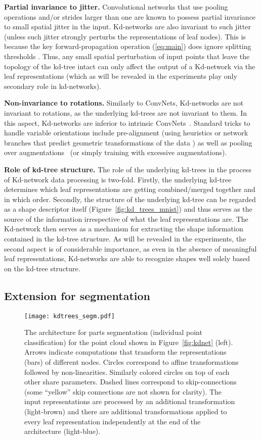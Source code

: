\documentclass[10pt,twocolumn,letterpaper]{article}
\newcommand{\fig}[1]{Figure~\ref{fig:#1}}
\newcommand{\eq}[1]{(\ref{eq:#1})}
\begin{document}
\textbf{Partial invariance to jitter.} Convolutional networks that use pooling operations and/or strides larger than one are known to possess partial invariance to small spatial jitter in the input. Kd-networks are also invariant to such jitter (unless such jitter strongly perturbs the representations of leaf nodes). This is because the key forward-propagation operation \eq{main} does ignore splitting thresholds . Thus, any small spatial perturbation of input points that leave the topology of the kd-tree intact can only affect the output of a Kd-network via the leaf representations (which as will be revealed in the experiments play only secondary role in kd-networks).

\textbf{Non-invariance to rotations.} Similarly to ConvNets, Kd-networks are not invariant to rotations, as the underlying kd-trees are not invariant to them. In this aspect, Kd-networks are inferior to intrinsic ConvNets~\cite{Bruna13,Boscaini15,Boscaini16}. Standard tricks to handle variable orientations include pre-alignment (using heuristics or network branches that predict geometric transformations of the data \cite{Jaderberg15,Qi16b}) as well as pooling over augmentations~\cite{Laptev16} (or simply training with excessive augmentations).

\textbf{Role of kd-tree structure.} The role of the underlying kd-trees in the process of Kd-network data processing is two-fold. Firstly, the underlying kd-tree determines which leaf representations are getting combined/merged together and in which order. Secondly, the structure of the underlying kd-tree can be regarded as a shape descriptor itself (\fig{kd_trees_mnist}) and thus serves as the source of the information irrespective of what the leaf representations are. The Kd-network then serves as a mechanism for extracting the shape information contained in the kd-tree structure. As will be revealed in the experiments, the second aspect is of considerable importance, as even in the absence of meaningful leaf representations, Kd-networks are able to recognize shapes well solely based on the kd-tree structure.

\subsection{Extension for segmentation}
\label{sect:segm}

\begin{figure}
    \centering
    \texttt{[image: kdtrees\_segm.pdf]}
    \caption{The architecture for parts segmentation (individual point classification) for the point cloud shown in \fig{kdnet} (left). Arrows indicate computations that transform the representations (bars) of different nodes. Circles correspond to affine transformations followed by non-linearities. Similarly colored circles on top of each other share parameters. Dashed lines correspond to skip-connections (some ``yellow'' skip connections are not shown for clarity). The input representations are processed by an additional transformation (light-brown) and there are additional transformations applied to every leaf representation independently at the end of the architecture (light-blue).}
    \label{fig:kdsegm}
\end{figure}
\end{document}
